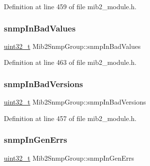 Definition at line 459 of file mib2\+\_\+module.\+h.

\mbox{\label{structMib2SnmpGroup_a488fe92698038302711b97ce3d0c156a}} 
\subsubsection{\texorpdfstring{snmp\+In\+Bad\+Values}{snmpInBadValues}}
{\footnotesize\ttfamily \hyperlink{stdint_8h_a435d1572bf3f880d55459d9805097f62}{uint32\+\_\+t} Mib2\+Snmp\+Group\+::snmp\+In\+Bad\+Values}



Definition at line 463 of file mib2\+\_\+module.\+h.

\mbox{\label{structMib2SnmpGroup_a1ded3012157dea4ac4e7b4276526ce1c}} 
\subsubsection{\texorpdfstring{snmp\+In\+Bad\+Versions}{snmpInBadVersions}}
{\footnotesize\ttfamily \hyperlink{stdint_8h_a435d1572bf3f880d55459d9805097f62}{uint32\+\_\+t} Mib2\+Snmp\+Group\+::snmp\+In\+Bad\+Versions}



Definition at line 457 of file mib2\+\_\+module.\+h.

\mbox{\label{structMib2SnmpGroup_a3d956783d74c50ff4924b7103192a499}} 
\subsubsection{\texorpdfstring{snmp\+In\+Gen\+Errs}{snmpInGenErrs}}
{\footnotesize\ttfamily \hyperlink{stdint_8h_a435d1572bf3f880d55459d9805097f62}{uint32\+\_\+t} Mib2\+Snmp\+Group\+::snmp\+In\+Gen\+Errs}



